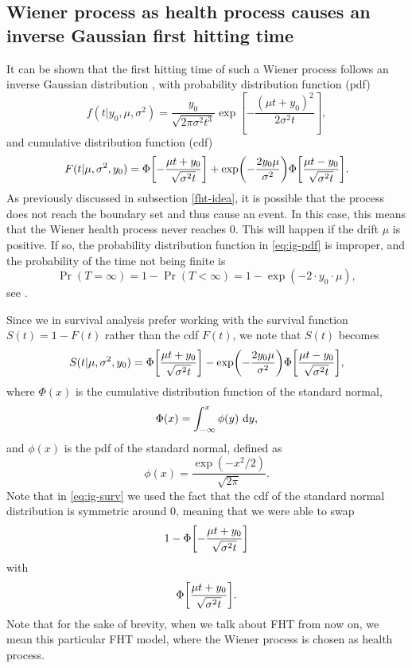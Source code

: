 \subsection{Wiener process as health process causes an inverse Gaussian first hitting time}
It can be shown that the first hitting time of such a Wiener process follows an inverse Gaussian distribution \citep{chhikara1988}, with probability distribution function (pdf)
\begin{equation}
\label{eq:ig-pdf}
    f(t|y_0,\mu,\sigma^2)=\frac{y_0}{\sqrt{2\pi\sigma^2t^3}}\exp\left[-\frac{(\mu t+y_0)^2}{2\sigma^2t}\right],
\end{equation}
and cumulative distribution function (cdf)
\begin{equation}
\label{eq:ig-cdf}
    F(t|\mu,\sigma^2,y_0)=\Phi\sqb*{-\frac{\mu t+y_0}{\sqrt{\sigma^2t}}}+\exp\p*{-\frac{2y_0\mu}{\sigma^2}}\Phi\sqb*{\frac{\mu t-y_0}{\sqrt{\sigma^2t}}}.
\end{equation}
As previously discussed in subsection \ref{fht-idea}, it is possible that the process does not reach the boundary set and thus cause an event.
In this case, this means that the Wiener health process never reaches 0.
This will happen if the drift $\mu$ is positive.
If so, the probability distribution function in \eqref{eq:ig-pdf} is improper, and the probability of the time not being finite is
\begin{equation}\label{eq:P-inf-FHT}
    \Pr{(T=\infty)}=1-\Pr{(T<\infty)}=1-\exp{(-2\cdot y_0\cdot\mu)},
\end{equation}
see \citet{cox1965}.

Since we in survival analysis prefer working with the survival function $S(t)=1-F(t)$ rather than the cdf $F(t)$, we note that $S(t)$ becomes
\begin{equation}
\label{eq:ig-surv}
    S(t|\mu,\sigma^2,y_0)=\Phi\sqb*{\frac{\mu t+y_0}{\sqrt{\sigma^2t}}}-\exp\p*{-\frac{2y_0\mu}{\sigma^2}}\Phi\sqb*{\frac{\mu t-y_0}{\sqrt{\sigma^2t}}},
\end{equation}
where $\Phi(x)$ is the cumulative distribution function of the standard normal,
\begin{equation*}
    \Phi(x)=\int_{-\infty}^x\phi(y)\text{~d}y,
\end{equation*}
and $\phi(x)$ is the pdf of the standard normal, defined as
\begin{equation*}
    \phi(x)=\frac{\exp\left(-x^2/2\right)}{\sqrt{2\pi}}.
\end{equation*}
Note that in \eqref{eq:ig-surv} we used the fact that the cdf of the standard normal distribution is symmetric around 0,
meaning that we were able to swap
\begin{equation*}
    1-\Phi\sqb*{-\frac{\mu t+y_0}{\sqrt{\sigma^2t}}}
\end{equation*}
with
\begin{equation*}
    \Phi\sqb*{\frac{\mu t+y_0}{\sqrt{\sigma^2t}}}.
\end{equation*}
Note that for the sake of brevity, when we talk about FHT from now on, we mean this particular FHT model, where the Wiener process is chosen as health process.

